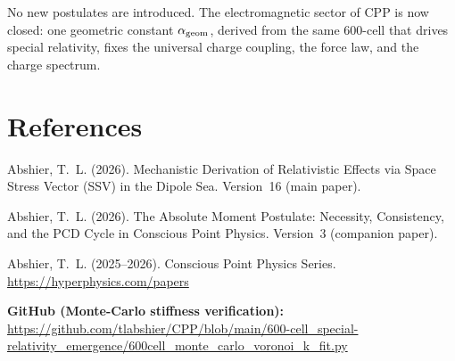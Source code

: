 \documentclass[12pt]{article}
\newcommand{\alphageom}{\alpha_{\rm geom}}
\begin{document}
No new postulates are introduced.  The electromagnetic sector of CPP is now
closed: one geometric constant $\alphageom$, derived from the same 600-cell
that drives special relativity, fixes the universal charge coupling, the force
law, and the charge spectrum.

\section*{References}

\begin{enumerate}[label={[\arabic*]}]
  \item Abshier, T.~L. (2026).
    Mechanistic Derivation of Relativistic Effects via Space Stress Vector
    (SSV) in the Dipole Sea.  Version~16 (main paper).

  \item Abshier, T.~L. (2026).
    The Absolute Moment Postulate: Necessity, Consistency, and the PCD Cycle
    in Conscious Point Physics.  Version~3 (companion paper).

  \item Abshier, T.~L. (2025--2026).
    Conscious Point Physics Series.
    \url{https://hyperphysics.com/papers}
\end{enumerate}

\bigskip
\noindent\textbf{GitHub (Monte-Carlo stiffness verification):}\\
\url{https://github.com/tlabshier/CPP/blob/main/600-cell_special-relativity_emergence/600cell_monte_carlo_voronoi_k_fit.py}
\end{document}
